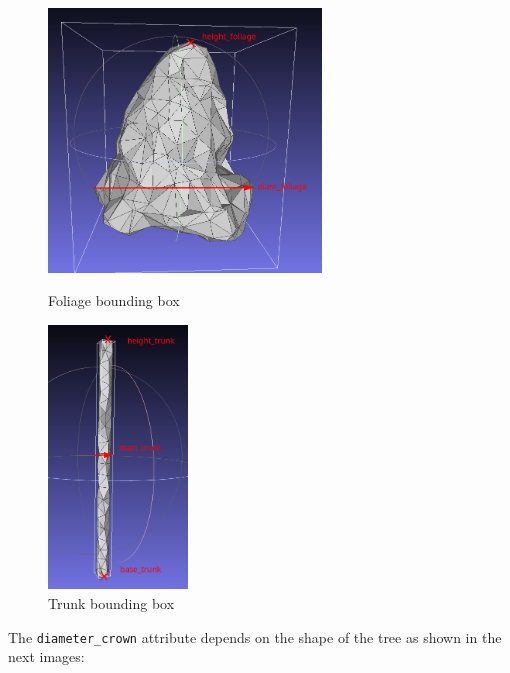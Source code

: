 \documentclass[12pt]{article}
\begin{document}
\begin{figure}[H]
    \centering
    \begin{minipage}{0.45\textwidth}
        \centering
        \includegraphics[height=7cm]{images/foliage_arrows.png}
        \caption{Foliage bounding box}
    \end{minipage}
    \begin{minipage}{0.45\textwidth}
        \centering
        \includegraphics[height=7cm]{images/trunk_arrows.png}
        \caption{Trunk bounding box}
    \end{minipage}
\end{figure}

The \texttt{diameter\_crown} attribute depends on the shape of the tree as shown
in the next images:
\end{document}
